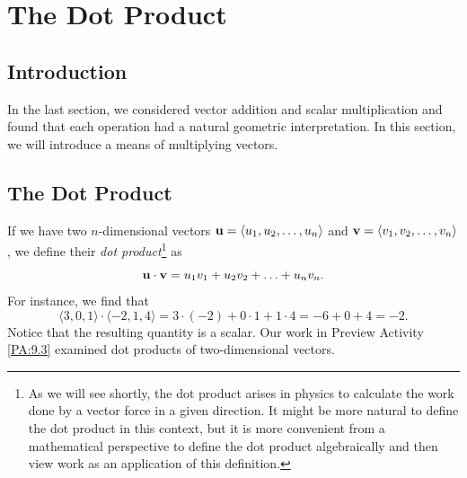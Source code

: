 \section{The Dot Product} \label{S:9.3.Dot_Product}

\vspace*{-14 pt}

\subsection*{Introduction}

In the last section, we considered vector addition and scalar
multiplication and found that each operation had a natural geometric
interpretation.  In this section, we will introduce a means of
multiplying vectors.



\subsection*{The Dot Product}

If we have two $n$-dimensional vectors 
$\mathbf{u}=\langle u_1, u_2,\ldots,u_n\rangle$ 
and 
$\mathbf{v}=\langle v_1, v_2,\ldots,v_n\rangle$, we define their \emph{dot
product}\footnote{As we will see shortly, the dot product arises in physics to calculate the work done by a vector force in a given direction. It might be more natural to define the dot product in this context, but it is more convenient from a mathematical perspective to define the dot product algebraically and then view work as an application of this definition.} as
$$
\mathbf{u}\cdot\mathbf{v} = u_1v_1+u_2v_2 + \ldots + u_nv_n.
$$
For instance, we find that
$$
\langle 3, 0, 1 \rangle\cdot\langle -2, 1, 4\rangle = 3\cdot(-2) +
0\cdot1 + 1\cdot4 = -6 + 0 + 4 = -2.
$$
Notice that the resulting quantity is a scalar.  Our work in Preview
Activity \ref{PA:9.3} examined dot products of two-dimensional
vectors.  

